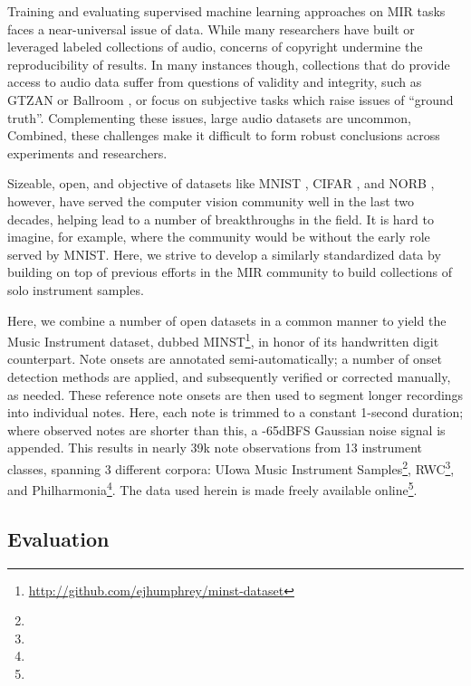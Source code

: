 \documentclass{article}
\begin{document}
Training and evaluating supervised machine learning approaches on MIR tasks faces a near-universal issue of data.
While many researchers have built or leveraged labeled collections of audio, concerns of copyright undermine the reproducibility of results.
In many instances though, collections that do provide access to audio data suffer from questions of validity and integrity, such as GTZAN \cite{Sturm} or Ballroom \cite{Sturm}, or focus on subjective tasks which raise issues of ``ground truth''.
Complementing these issues, large audio datasets are uncommon,
Combined, these challenges make it difficult to form robust conclusions across experiments and researchers.

Sizeable, open, and objective of datasets like MNIST \cite{}, CIFAR \cite{}, and NORB \cite{}, however, have served the computer vision community well in the last two decades, helping lead to a number of breakthroughs in the field.
It is hard to imagine, for example, where the community would be without the early role served by MNIST.
Here, we strive to develop a similarly standardized data by building on top of previous efforts in the MIR community to build collections of solo instrument samples.

Here, we combine a number of open datasets in a common manner to yield the Music Instrument dataset, dubbed MINST\footnote{\url{http://github.com/ejhumphrey/minst-dataset}}, in honor of its handwritten digit counterpart.
Note onsets are annotated semi-automatically;
a number of onset detection methods are applied, and subsequently verified or corrected manually, as needed.
These reference note onsets are then used to segment longer recordings into individual notes.
Here, each note is trimmed to a constant 1-second duration; where observed notes are shorter than this, a -65dBFS Gaussian noise signal is appended.
This results in nearly 39k note observations from 13 instrument classes, spanning 3 different corpora:
UIowa Music Instrument Samples\footnote{}, RWC\footnote{}, and Philharmonia\footnote{}.
The data used herein is made freely available online\footnote{}.


\subsection{Evaluation}
\end{document}
